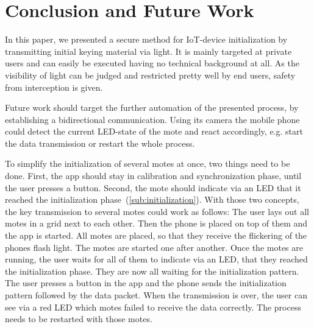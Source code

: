 \documentclass{sig-alternate} %
\begin{document}
\section{Conclusion and Future Work}
\label{sec:future_work}

In this paper, we presented a secure method for IoT-device initialization by transmitting initial keying material via light.
It is mainly targeted at private users and can easily be executed having no technical background at all.
As the visibility of light can be judged and restricted pretty well by end users, safety from interception is given.

Future work should target the further automation of the presented process, by establishing a bidirectional communication.
Using its camera the mobile phone could detect the current LED-state of the mote and react accordingly, e.g. start the data transmission or restart the whole process.

To simplify the initialization of several motes at once, two things need to be done.
First, the app should stay in calibration and synchronization phase, until the user presses a button.
Second, the mote should indicate via an LED that it reached the initialization phase~(\ref{sub:initialization}).
With those two concepts, the key transmission to several motes could work as follows:
The user lays out all motes in a grid next to each other.
Then the phone is placed on top of them and the app is started.
All motes are placed, so that they receive the flickering of the phones flash light.
The motes are started one after another.
Once the motes are running, the user waits for all of them to indicate via an LED, that they reached the initialization phase.
They are now all waiting for the initialization pattern.
The user presses a button in the app and the phone sends the initialization pattern followed by the data packet.
When the transmission is over, the user can see via a red LED which motes failed to receive the data correctly.
The process needs to be restarted with those motes.




\end{document}
